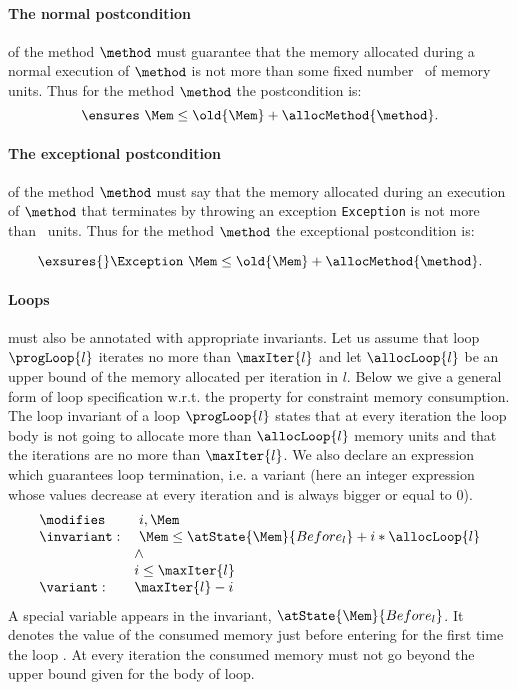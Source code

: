 \paragraph{The normal postcondition} of the method $\method$ must
guarantee that the memory allocated during a normal execution of
$\method$ is not more than some fixed number \allocMethod{\method}\
of memory units. Thus for the method $\method$ the postcondition is:
$$
\ensures \  \Mem \leq \old{\Mem} + \allocMethod{\method}.
$$

\paragraph{The exceptional postcondition} of the method $\method$ must
say that the memory allocated during an execution of $\method$ that
terminates by throwing an exception \texttt{Exception} is not more
than \allocMethod{\method}\ units. Thus for the method $\method$ the
exceptional postcondition is:

$$
\exsures{} \Exception \  \Mem \leq \old{\Mem} + \allocMethod{\method}.
$$


\paragraph{Loops} must also be annotated with appropriate invariants. 
Let us assume that loop $\progLoop{l}$ iterates no more than $\maxIter{l}$ and let $\allocLoop{l}$ be an upper bound of the memory allocated per iteration in $l$.
Below we give a general form of loop specification w.r.t. the property for constraint memory consumption. The loop invariant of a loop $\progLoop{l}$ states that at every iteration the loop body is not going to allocate more than $\allocLoop{l}$ memory units and that the iterations are no more than $\maxIter{l}$. We also declare an expression which guarantees loop termination, i.e. a variant (here an integer expression whose values decrease at every iteration  and is always bigger or equal to 0).
$$\begin{array}{ll}
\modifies &  \ i, \Mem \\
\invariant: & \ \Mem \le \atState{\Mem}{Before_{l}} + i * \allocLoop{l} \\
                & \wedge \\
                & i \le \maxIter{l}\\
\variant: & \maxIter{l} - i \\
\end{array}$$
 A special variable appears in the invariant, $\atState{\Mem}{Before_{l}}$. It denotes the value of the consumed memory just before entering for the first time the loop . At every iteration the consumed memory must not go beyond the upper bound given for the body of loop.

